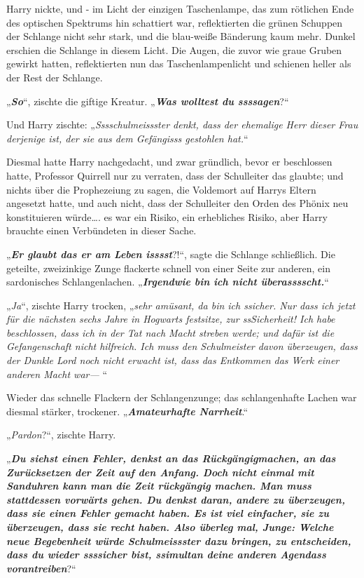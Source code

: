 {Harry nickte, und - im Licht der einzigen Taschenlampe, das zum rötlichen Ende des optischen Spektrums hin schattiert war, reflektierten die grünen Schuppen der Schlange nicht sehr stark, und die blau-weiße Bänderung kaum mehr. Dunkel erschien die Schlange in diesem Licht. Die Augen, die zuvor wie graue Gruben gewirkt hatten, reflektierten nun das Taschenlampenlicht und schienen heller als der Rest der Schlange.

„\textbf{\emph{So}}“, zischte die giftige Kreatur. „\textbf{\emph{Was wolltest du ssssagen}}?“

Und Harry zischte: „\emph{Sssschulmeissster denkt, dass der ehemalige Herr dieser Frau derjenige ist, der sie aus dem Gefängisss gestohlen hat.}“

Diesmal hatte Harry nachgedacht, und zwar gründlich, bevor er beschlossen hatte, Professor Quirrell nur zu verraten, dass der Schulleiter das glaubte; und nichts über die Prophezeiung zu sagen, die Voldemort auf Harrys Eltern angesetzt hatte, und auch nicht, dass der Schulleiter den Orden des Phönix neu konstituieren würde…. es war ein Risiko, ein erhebliches Risiko, aber Harry brauchte einen Verbündeten in dieser Sache.

„\textbf{\emph{Er glaubt das er am Leben isssst}}?!“, sagte die Schlange schließlich. Die geteilte, zweizinkige Zunge flackerte schnell von einer Seite zur anderen, ein sardonisches Schlangenlachen. „\textbf{\emph{Irgendwie bin ich nicht überasssscht.}}“

„\emph{Ja}“, zischte Harry trocken, „\emph{sehr amüsant, da bin ich ssicher. Nur dass ich jetzt für die nächsten sechs Jahre in Hogwarts festsitze, zur ssSicherheit! Ich habe beschlossen, dass ich in der Tat nach Macht streben werde; und dafür ist die Gefangenschaft nicht hilfreich. Ich muss den Schulmeister davon überzeugen, dass der Dunkle Lord noch nicht erwacht ist, dass das Entkommen das Werk einer anderen Macht war—} “

Wieder das schnelle Flackern der Schlangenzunge; das schlangenhafte Lachen war diesmal stärker, trockener. „\textbf{\emph{Amateurhafte Narrheit}}.“

„\emph{Pardon}?“, zischte Harry.

„\textbf{\emph{Du siehst einen Fehler, denkst an das Rückgängigmachen, an das Zurücksetzen der Zeit auf den Anfang. Doch nicht einmal mit Sanduhren kann man die Zeit rückgängig machen. Man muss stattdessen vorwärts gehen. Du denkst daran, andere zu überzeugen, dass sie einen Fehler gemacht haben. Es ist viel einfacher, sie zu überzeugen, dass sie recht haben. Also überleg mal, Junge: Welche neue Begebenheit würde Schulmeissster dazu bringen, zu entscheiden, dass du wieder ssssicher bist, ssimultan deine anderen Agendass vorantreiben}}?“

}
